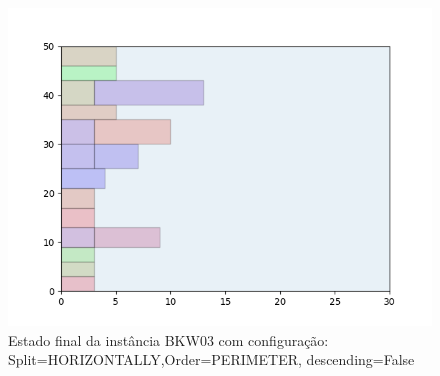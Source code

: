 \begin{figure}[H]
    \centering
    \caption[]{Estado final da instância BKW03 com configuração: Split=HORIZONTALLY,Order=PERIMETER, descending=False}
    \label{fig:bkw03-horizontally-perimeter-false}
    \includegraphics[scale=0.5]{output/figures/bkw/bkw03/horizontally/perimeter/false/00}
\end{figure}